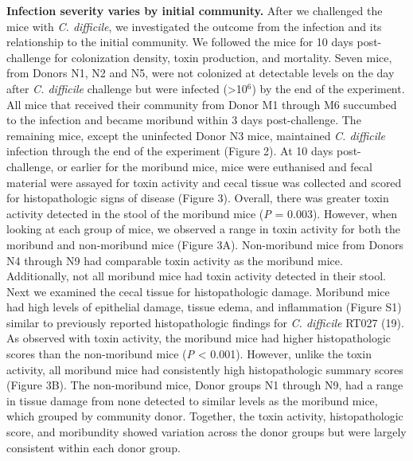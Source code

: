 \documentclass[
  12pt,
]{article}
\begin{document}
\textbf{Infection severity varies by initial community.} After we
challenged the mice with \emph{C. difficile}, we investigated the
outcome from the infection and its relationship to the initial
community. We followed the mice for 10 days post-challenge for
colonization density, toxin production, and mortality. Seven mice, from
Donors N1, N2 and N5, were not colonized at detectable levels on the day
after \emph{C. difficile} challenge but were infected
(\textgreater10\(^{6}\)) by the end of the experiment. All mice that
received their community from Donor M1 through M6 succumbed to the
infection and became moribund within 3 days post-challenge. The
remaining mice, except the uninfected Donor N3 mice, maintained \emph{C.
difficile} infection through the end of the experiment (Figure 2). At 10
days post-challenge, or earlier for the moribund mice, mice were
euthanised and fecal material were assayed for toxin activity and cecal
tissue was collected and scored for histopathologic signs of disease
(Figure 3). Overall, there was greater toxin activity detected in the
stool of the moribund mice (\emph{P} = 0.003). However, when looking at
each group of mice, we observed a range in toxin activity for both the
moribund and non-moribund mice (Figure 3A). Non-moribund mice from
Donors N4 through N9 had comparable toxin activity as the moribund mice.
Additionally, not all moribund mice had toxin activity detected in their
stool. Next we examined the cecal tissue for histopathologic damage.
Moribund mice had high levels of epithelial damage, tissue edema, and
inflammation (Figure S1) similar to previously reported histopathologic
findings for \emph{C. difficile} RT027 (19). As observed with toxin
activity, the moribund mice had higher histopathologic scores than the
non-moribund mice (\emph{P} \textless{} 0.001). However, unlike the
toxin activity, all moribund mice had consistently high histopathologic
summary scores (Figure 3B). The non-moribund mice, Donor groups N1
through N9, had a range in tissue damage from none detected to similar
levels as the moribund mice, which grouped by community donor. Together,
the toxin activity, histopathologic score, and moribundity showed
variation across the donor groups but were largely consistent within
each donor group.
\end{document}
